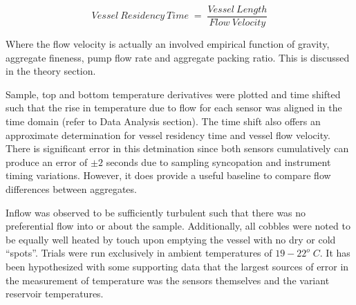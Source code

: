 \[Vessel\:Residency\:Time\;=\;\frac{Vessel\:Length}{Flow\:Velocity}\]

\noindent Where the flow velocity is actually an involved empirical function of gravity, aggregate fineness, pump flow rate and aggregate packing ratio. This is discussed in the theory section. 

Sample, top and bottom temperature derivatives were plotted and time shifted such that the rise in temperature due to flow for each sensor was aligned in the time domain (refer to Data Analysis section). The time shift also offers an approximate determination for vessel residency time and vessel flow velocity. There is significant error in this detmination since both sensors cumulatively can produce an error of $\pm2$ seconds due to sampling syncopation and instrument timing variations. However, it does provide a useful baseline to compare flow differences between aggregates. 

Inflow was observed to be sufficiently turbulent such that there was no preferential flow into or about the sample. Additionally, all cobbles were noted to be equally well heated by touch upon emptying the vessel with no dry or cold ``spots''. Trials were run exclusively in ambient temperatures of $19-22^{o}\;C$. It has been hypothesized with some supporting data that the largest sources of error in the measurement of temperature was the sensors themselves and the variant reservoir temperatures.